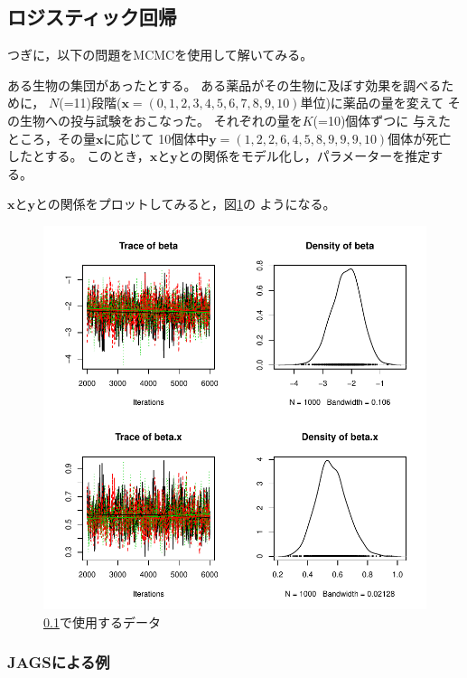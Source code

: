 \documentclass[11pt,uplatex]{jsarticle}
\begin{document}

\clearpage

\subsection{ロジスティック回帰}
\label{logistic}


つぎに，以下の問題をMCMCを使用して解いてみる。
\vspace{1zw}

\hspace{18mm}
\begin{minipage}{100mm}
\begin{breakbox}
\noindent
ある生物の集団があったとする。
ある薬品がその生物に及ぼす効果を調べるために，
$N$(=11)段階($\bm{x} = (0, 1, 2, 3, 4, 5, 6, 7, 8, 9, 10)$単位)に薬品の量を変えて
その生物への投与試験をおこなった。
それぞれの量を$K$(=10)個体ずつに
与えたところ，その量$\bm{x}$に応じて
10個体中$\bm{y} = (1, 2, 2, 6, 4, 5, 8, 9, 9, 9, 10)$個体が死亡したとする。
このとき，$\bm{x}$と$\bm{y}$との関係をモデル化し，パラメーターを推定する。
\end{breakbox}
\end{minipage}
\vspace{1zw}

$\bm{x}$と$\bm{y}$との関係をプロットしてみると，図\ref{example2_plot}の
ようになる。

\begin{figure}[htbp]
  \begin{center}
    \includegraphics[bb=0 0 240 240, clip, width=160 bp]{example2.pdf}
  \end{center}
  \caption{\ref{logistic}で使用するデータ}
  \label{example2_plot}
\end{figure}

\subsubsection{JAGSによる例}
\end{document}
